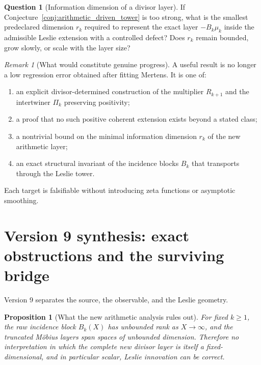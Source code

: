 \documentclass[11pt]{amsart}
\numberwithin{equation}{section}
\theoremstyle{plain}
\newtheorem{proposition}[theorem]{Proposition}
\theoremstyle{definition}
\newtheorem{question}[theorem]{Question}
\theoremstyle{remark}
\newtheorem{remark}[theorem]{Remark}
\begin{document}
\begin{question}[Information dimension of a divisor layer]
\label{q:divisor_layer_information_dimension}
If Conjecture~\ref{conj:arithmetic_driven_tower} is too strong, what is the smallest
predeclared dimension $r_k$ required to represent the exact layer
$-B_k\mu_k$ inside the admissible Leslie extension with a controlled defect?
Does $r_k$ remain bounded, grow slowly, or scale with the layer size?
\end{question}

\begin{remark}[What would constitute genuine progress]
\label{rem:v8_genuine_progress}
A useful result is no longer a low regression error obtained after fitting Mertens.  It is one of:
\begin{enumerate}
\item an explicit divisor-determined construction of the multiplier $R_{k+1}$ and the
intertwiner $\Pi_k$ preserving positivity;
\item a proof that no such positive coherent extension exists beyond a stated class;
\item a nontrivial bound on the minimal information dimension $r_k$ of the new arithmetic layer;
\item an exact structural invariant of the incidence blocks $B_k$ that transports through the
Leslie tower.
\end{enumerate}
Each target is falsifiable without introducing zeta functions or asymptotic smoothing.
\end{remark}



\section{Version 9 synthesis: exact obstructions and the surviving bridge}
\label{sec:v9_synthesis}

Version 9 separates the source, the observable, and the Leslie geometry.

\begin{proposition}[What the new arithmetic analysis rules out]
\label{prop:v9_negative_exact_summary}
For fixed $k\ge1$, the raw incidence block $B_k(X)$ has unbounded rank as $X\to\infty$, and the
truncated M\"obius layers span spaces of unbounded dimension.  Therefore no interpretation in
which the complete new divisor layer is itself a fixed-dimensional, and in particular scalar,
Leslie innovation can be correct.
\end{proposition}
\end{document}

